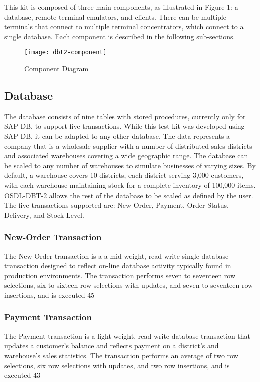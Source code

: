 \documentclass{article}
\begin{document}
This kit is composed of three main components, as illustrated in Figure 1: a
database, remote terminal emulators, and clients.  There can be multiple
terminals that connect to multiple terminal concentrators, which connect to a
single database.  Each component is described in the following sub-sections.

\begin{figure}[h]
\centering
\texttt{[image: dbt2-component]}
\caption{Component Diagram}
\end{figure}

\subsection{Database}

The database consists of nine tables with stored procedures, currently only
for SAP DB, to support five transactions.  While this test kit was developed
using SAP DB, it can be adapted to any other database.  The data represents a
company that is a wholesale supplier with a number of distributed sales
districts and associated warehouses covering a wide geographic range.  The
database can be scaled to any number of warehouses to simulate businesses of
varying sizes.  By default, a warehouse covers 10 districts, each district
serving 3,000 customers, with each warehouse maintaining stock for a complete
inventory of 100,000 items.  OSDL-DBT-2 allows the rest of the database to be
scaled as defined by the user.  The five transactions supported are:
New-Order, Payment, Order-Status, Delivery, and Stock-Level.

\subsubsection{New-Order Transaction}

The New-Order transaction is a a mid-weight, read-write single database
transaction designed to reflect on-line database activity typically found in
production environments.  The transaction performs seven to seventeen row
selections, six to sixteen row selections with updates, and seven to
seventeen row insertions, and is executed 45%

\subsubsection{Payment Transaction}

The Payment transaction is a light-weight, read-write database transaction
that updates a customer's balance and reflects payment on a district's and
warehouse's sales statistics.  The transaction performs an average of two row
selections, six row selections with updates, and two row insertions, and is
executed 43%
\end{document}

